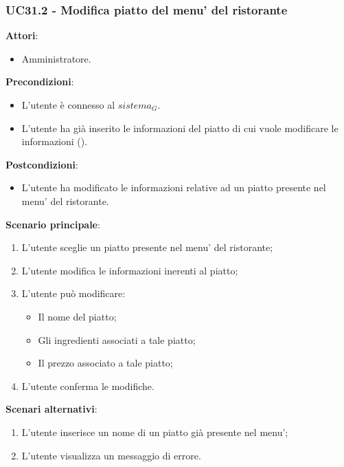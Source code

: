 \subsubsection{UC31.2 - Modifica piatto del menu' del ristorante}\label{usecase:31_2}
\textbf{Attori}:
\begin{itemize}
    \item Amministratore.
\end{itemize}
\textbf{Precondizioni}:
\begin{itemize}
    \item L'utente è connesso al $\textit{sistema}_G$.
    \item L'utente ha già inserito le informazioni del piatto di cui vuole modificare le informazioni ().
\end{itemize}
\textbf{Postcondizioni}:
\begin{itemize}
    \item L'utente ha modificato le informazioni relative ad un piatto presente nel menu' del ristorante.
\end{itemize}
\textbf{Scenario principale}:
\begin{enumerate}
    \item L'utente sceglie un piatto presente nel menu' del ristorante;
    \item L'utente modifica le informazioni inerenti al piatto;
    \item L'utente può modificare:
    \begin{itemize}
        \item Il nome del piatto;
        \item Gli ingredienti associati a tale piatto;
        \item Il prezzo associato a tale piatto;
    \end{itemize}
    \item L'utente conferma le modifiche.
\end{enumerate}
\textbf{Scenari alternativi}:
\begin{enumerate}
    \item L’utente inserisce un nome di un piatto già presente nel menu’;
    \item L'utente visualizza un messaggio di errore.
\end{enumerate}